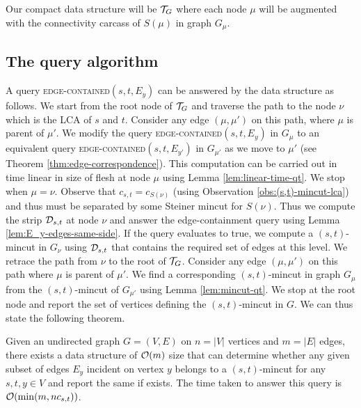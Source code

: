 Our compact data structure will be ${\cal T}_G$ where each node $\mu$ will be augmented with the connectivity carcass of $S(\mu)$ in graph $G_\mu$. 

\subsection{The query algorithm}

A query \textsc{edge-contained}$(s,t,E_y)$ can be answered by the data structure as follows. We start from the root node of ${\cal T}_G$ and traverse the path to the node $\nu$ which is the LCA of $s$ and $t$. Consider any edge $(\mu,\mu')$ on this path, where $\mu$ is parent of $\mu'$. We modify the query \textsc{edge-contained}$(s,t,E_y)$ in $G_{\mu}$ to an equivalent query \textsc{edge-contained}$(s,t,E_{y'})$ in $G_{\mu'}$ as we move to $\mu'$ (see Theorem \ref{thm:edge-correspondence}). This computation can be carried out in time linear in size of flesh at node $\mu$ using Lemma \ref{lem:linear-time-qt}. We stop when $\mu = \nu$. Observe that $c_{s,t} = c_{S(\nu)}$ (using Observation \ref{obs:(s,t)-mincut-lca}) and thus must be separated by some Steiner mincut for $S(\nu)$.
Thus we compute the strip ${\cal D}_{s,t}$ at node $\nu$ and answer the edge-containment query using Lemma \ref{lem:E_y-edges-same-side}. If the query evaluates to true, we compute a $(s,t)$-mincut in $G_\nu$ using ${\cal D}_{s,t}$ that contains the required set of edges at this level. We retrace the path from $\nu$ to the root of ${\cal T}_G$.
Consider any edge $(\mu,\mu')$ on this path where $\mu$ is parent of $\mu'$. We find a corresponding $(s,t)$-mincut in graph $G_\mu$ from the $(s,t)$-mincut of $G_{\mu'}$ using Lemma \ref{lem:mincut-qt}. We stop at the root node and report the set of vertices defining the $(s,t)$-mincut in $G$.
We can thus state the following theorem.

\begin{theorem}
Given an undirected graph $G=(V,E)$ on $n=|V|$ vertices and $m=|E|$ edges, there exists a data structure of ${\cal O}(m)$ size that can determine whether any given subset of edges $E_y$ incident on vertex $y$ belongs to a $(s,t)$-mincut for any $s,t,y\in V$ and report the same if exists. The time taken to answer this query is ${\cal O}(\min(m,nc_{s,t}))$.
\label{thm:O(m)-size-data-structure}
\end{theorem}

